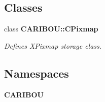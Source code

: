 \subsection*{Classes}
\begin{DoxyCompactItemize}
\item 
class {\bf C\-A\-R\-I\-B\-O\-U\-::\-C\-Pixmap}
\begin{DoxyCompactList}\small\item\em Defines X\-Pixmap storage class. \end{DoxyCompactList}\end{DoxyCompactItemize}
\subsection*{Namespaces}
\begin{DoxyCompactItemize}
\item 
{\bf C\-A\-R\-I\-B\-O\-U}
\end{DoxyCompactItemize}
